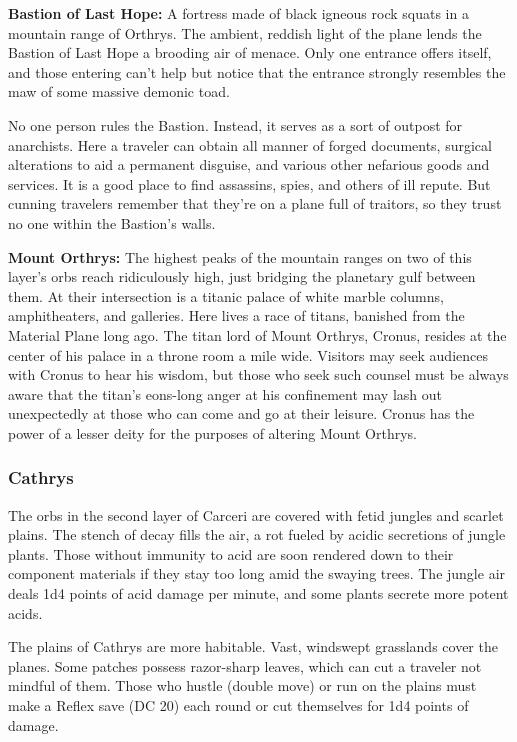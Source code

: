 \textbf{Bastion of Last Hope:} A fortress made of black igneous rock squats in a mountain range of Orthrys. The ambient, reddish light of the plane lends the Bastion of Last Hope a brooding air of menace. Only one entrance offers itself, and those entering can't help but notice that the entrance strongly resembles the maw of some massive demonic toad.

No one person rules the Bastion. Instead, it serves as a sort of outpost for anarchists. Here a traveler can obtain all manner of forged documents, surgical alterations to aid a permanent disguise, and various other nefarious goods and services. It is a good place to find assassins, spies, and others of ill repute. But cunning travelers remember that they're on a plane full of traitors, so they trust no one within the Bastion's walls.

\textbf{Mount Orthrys:} The highest peaks of the mountain ranges on two of this layer's orbs reach ridiculously high, just bridging the planetary gulf between them. At their intersection is a titanic palace of white marble columns, amphitheaters, and galleries. Here lives a race of titans, banished from the Material Plane long ago. The titan lord of Mount Orthrys, Cronus, resides at the center of his palace in a throne room a mile wide. Visitors may seek audiences with Cronus to hear his wisdom, but those who seek such counsel must be always aware that the titan's eons-long anger at his confinement may lash out unexpectedly at those who can come and go at their leisure. Cronus has the power of a lesser deity for the purposes of altering Mount Orthrys.

\subsubsection{Cathrys}
The orbs in the second layer of Carceri are covered with fetid jungles and scarlet plains. The stench of decay fills the air, a rot fueled by acidic secretions of jungle plants. Those without immunity to acid are soon rendered down to their component materials if they stay too long amid the swaying trees. The jungle air deals 1d4 points of acid damage per minute, and some plants secrete more potent acids.

The plains of Cathrys are more habitable. Vast, windswept grasslands cover the planes. Some patches possess razor-sharp leaves, which can cut a traveler not mindful of them. Those who hustle (double move) or run on the plains must make a Reflex save (DC 20) each round or cut themselves for 1d4 points of damage.

